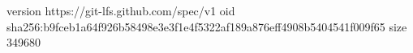 version https://git-lfs.github.com/spec/v1
oid sha256:b9fceb1a64f926b58498e3e3f1e4f5322af189a876eff4908b5404541f009f65
size 349680
